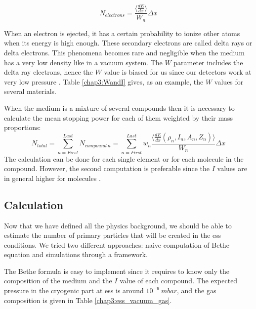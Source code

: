\begin{refsection}
  \begin{equation}
    N_{electrons}= \frac{\big \langle \frac{dE}{dx} \big \rangle}{W_{n}} \Delta x
  \end{equation}

  When an electron is ejected, it has a certain probability to ionize other atoms when its energy is high enough. These secondary electrons are called delta rays or delta electrons. This phenomena becomes rare and negligible when the medium has a very low density like in a vacuum system. The \(W\) parameter includes the delta ray electrons, hence the \(W\) value is biased for us since our detectors work at very low pressure \cite[p. 470]{Tanabashi2018}. Table \ref{chap3:WandI} gives, as an example, the \(W\) values for several materials.

  

  When the medium is a mixture of several compounds then it is necessary to calculate the mean stopping power for each of them weighted by their mass proportions:
  \begin{equation}
    N_{total}= \sum_{n= First}^{Last} N_{compound\ n}= \sum_{n= First}^{Last} w_{n} \frac{\big \langle \frac{dE}{dx}\left(\rho_{n},I_{n},A_{n},Z_{n}\right) \big \rangle}{W_{n}} \Delta x
  \end{equation}
  The calculation can be done for each single element or for each molecule in the compound.
  However, the second computation is preferable since the \(I\) values are in general higher for molecules \cite[p. 451]{Tanabashi2018}.

  \subsection{Calculation}

  Now that we have defined all the physics background, we should be able to estimate the number of primary particles that will be created in the \acrshort{ess} conditions. We tried two different approaches: naive computation of Bethe equation and simulations through a framework.

  The Bethe formula is easy to implement since it requires to know only the composition of the medium and the \(I\) value of each compound. The expected pressure in the cryogenic part at \acrshort{ess} is around \(10^{-9}\ mbar\), and the gas composition is given in Table \ref{chap3:ess_vacuum_gas}.

  


\end{refsection}
